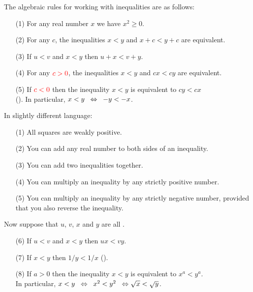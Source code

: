 \documentclass[a4paper]{book}
\theoremstyle{definition}
\begin{document}
The algebraic rules for working with inequalities are as follows:
\begin{itemize}
 \item[(1)]
  For any real number $x$ we have $x^2\geq 0$.
 \item[(2)]
  For any $c$, the inequalities $x<y$ and $x+c<y+c$ are equivalent.
 \item[(3)]
  If $u<v$ and $x<y$ then $u+x<v+y$.
 \item[(4)]
  For any ${\color{red}c>0}$, the inequalities $x<y$ and $cx<cy$ are equivalent.
 \item[(5)]
  If ${\color{red}c<0}$ then the inequality $x<y$ is equivalent to $cy<cx$ \\
  ().  In particular, $x<y\;\;\Leftrightarrow\;\;-y<-x$.
\end{itemize}
In slightly different language:
\begin{itemize}
 \item[(1)] All squares are weakly positive.
 \item[(2)] You can add any real number to both sides of an inequality.
 \item[(3)] You can add two inequalities together.
 \item[(4)] You can multiply an inequality by any strictly positive
  number.
 \item[(5)] You can multiply an inequality by any strictly negative
  number, provided that you also reverse the inequality.
\end{itemize}

Now suppose that $u$, $v$, $x$ and $y$ are all .
\begin{itemize}
 \item[(6)] 
  If $u<v$ and $x<y$ then $ux<vy$.
 \item[(7)] 
  If $x<y$ then $1/y<1/x$ ().
 \item[(8)] 
  If $a>0$ then the inequality $x<y$ is equivalent to $x^a<y^a$. \\
  In particular,
  $x<y \;\;\Leftrightarrow\;\; x^2<y^2 \;\;\Leftrightarrow \sqrt{x}<\sqrt{y}$.
\end{itemize}
\end{document}
